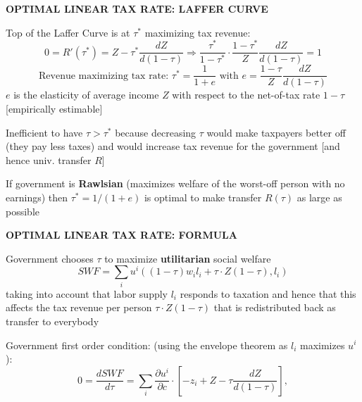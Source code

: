 \documentclass[landscape]{slides}
\begin{document}
\begin{slide}
\begin{center}
{\bf OPTIMAL LINEAR TAX RATE: LAFFER CURVE}
\end{center}

Top of the Laffer Curve is at $\tau^*$
maximizing tax revenue:
\[0=R'(\tau^*)=Z - \tau^* \frac{d Z}{d(1-\tau)} \Rightarrow \frac{\tau^*}{1-\tau^*} \cdot \frac{1-\tau^*}{Z} \frac{d Z}{d(1-\tau)} = 1  \]
\[ \text {Revenue maximizing tax rate: }  \tau^*=\frac{1}{1+e} \text{ with } e = \frac{1-\tau}{Z}\frac{dZ}{d(1-\tau)} \] $e$
is the
elasticity of average income $Z$ with respect to the net-of-tax rate $1-\tau$ [empirically estimable]

Inefficient to have $\tau>\tau^*$ because decreasing $\tau$ would make taxpayers better off (they pay less taxes)
and would increase tax revenue for the government [and hence univ. transfer $R$]

If government is \textbf{Rawlsian} (maximizes welfare of the worst-off person with no earnings) then $\tau^*=1/(1+e)$ is optimal
to make transfer $R(\tau)$ as large as possible
\end{slide}


\begin{slide}
\begin{center}
{\bf OPTIMAL LINEAR TAX RATE: FORMULA}
\end{center}
Government chooses $\tau$ to maximize \textbf{utilitarian} social welfare
\[ SWF = \sum_i u^i((1-\tau)w_i l_i+\tau \cdot Z(1-\tau),l_i)  \]
taking into account that labor supply $l_i$ responds to taxation and hence
that this affects the tax revenue per person $\tau \cdot Z(1-\tau)$ that is redistributed
back as transfer to everybody

Government first order condition: (using the envelope theorem as $l_i$ maximizes $u^i$):
\[ 0 = \frac{dSWF}{d\tau} =  \sum_i \frac{ \partial u^i}{\partial c} \cdot
\left [-z_i + Z - \tau \frac{dZ}{d(1-\tau)} \right ],\]

\end{slide}
\end{document}
